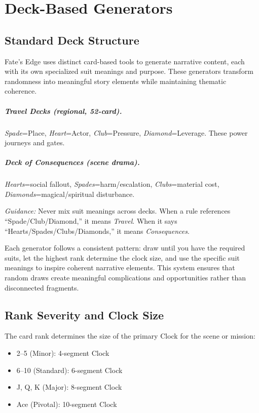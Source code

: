 \chapter{Deck-Based Generators}

\section{Standard Deck Structure}

Fate's Edge uses distinct card-based tools to generate narrative content, each with its own specialized suit meanings and purpose. These generators transform randomness into meaningful story elements while maintaining thematic coherence.

\paragraph{Travel Decks (regional, 52-card).}
\emph{Spade}=Place, \emph{Heart}=Actor, \emph{Club}=Pressure, \emph{Diamond}=Leverage. These power journeys and gates.

\paragraph{Deck of Consequences (scene drama).}
\emph{Hearts}=social fallout, \emph{Spades}=harm/escalation, \emph{Clubs}=material cost, \emph{Diamonds}=magical/spiritual disturbance.

\textit{Guidance:} Never mix suit meanings across decks. When a rule references ``Spade/Club/Diamond,'' it means \emph{Travel}. When it says ``Hearts/Spades/Clubs/Diamonds,'' it means \emph{Consequences}.

Each generator follows a consistent pattern: draw until you have the required suits, let the highest rank determine the clock size, and use the specific suit meanings to inspire coherent narrative elements. This system ensures that random draws create meaningful complications and opportunities rather than disconnected fragments.

\section{Rank Severity and Clock Size}

The card rank determines the size of the primary Clock for the scene or mission:

\begin{itemize}
\item 2--5 (Minor): 4-segment Clock
\item 6--10 (Standard): 6-segment Clock
\item J, Q, K (Major): 8-segment Clock
\item Ace (Pivotal): 10-segment Clock
\end{itemize}

